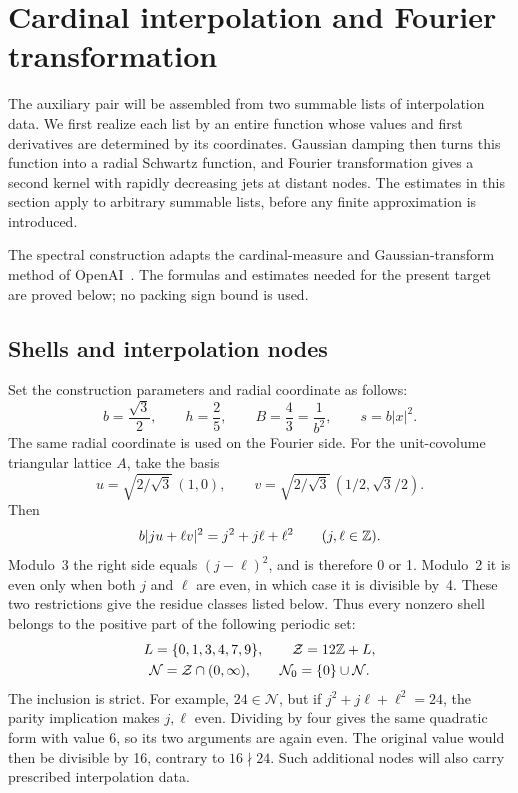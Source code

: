 \section{Cardinal interpolation and Fourier transformation}
\label{sec:fourier}

The auxiliary pair will be assembled from two summable lists of interpolation
data.  We first realize each list by an entire function whose values and first
derivatives are determined by its coordinates.  Gaussian damping then turns this function
into a radial Schwartz function, and Fourier transformation gives a second
kernel with rapidly decreasing jets at distant nodes.  The estimates in this
section apply to arbitrary summable lists, before any finite approximation is
introduced.

The spectral construction adapts the cardinal-measure and Gaussian-transform
method of OpenAI~\citep[Section~2]{SharpPlanar2026}.  The formulas and estimates needed
for the present target are proved below; no packing sign bound is used.

\subsection{Shells and interpolation nodes}

Set the construction parameters and radial coordinate as follows:
\begin{equation}\label{eq:normalization}
 b=\frac{\sqrt3}{2},\qquad h=\frac25,\qquad
 B=\frac43=\frac1{b^2},\qquad s=b|x|^2.
\end{equation}
The same radial coordinate is used on the Fourier side.  For the unit-covolume
triangular lattice \(A\), take the basis
\[
 u=\sqrt{2/\sqrt3}\,(1,0),\qquad
 v=\sqrt{2/\sqrt3}\,(1/2,\sqrt3/2).
\]
Then
\[
 b|ju+\ell v|^2=j^2+j\ell+\ell^2\qquad(j,\ell\in\mathbb Z).
\]
Modulo~3 the right side equals \((j-\ell)^2\), and is therefore 0 or 1.
Modulo~2 it is even only when both \(j\) and \(\ell\) are even, in which
case it is divisible by~4.  These two restrictions give the residue classes
listed below.  Thus every nonzero shell belongs to the positive part of the
following periodic set:
\begin{equation}\label{eq:node-set}
 \begin{gathered}
 L=\{0,1,3,4,7,9\},\qquad \mathcal Z=12\mathbb Z+L,\\
 \mathcal N=\mathcal Z\cap(0,\infty),\qquad
 \mathcal N_0=\{0\}\cup\mathcal N.
 \end{gathered}
\end{equation}
The inclusion is strict.  For example, \(24\in\mathcal N\), but if
\(j^2+j\ell+\ell^2=24\), the parity implication makes \(j,\ell\) even.
Dividing by four gives the same quadratic form with value 6, so its two
arguments are again even.  The original value would then be divisible by 16,
contrary to \(16\nmid24\).  Such additional nodes will also carry prescribed
interpolation data.

